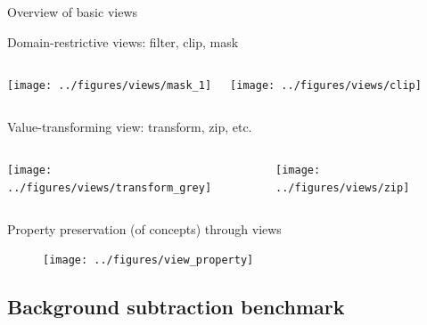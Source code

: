 \documentclass[12pt,aspectratio=169]{beamer}
\begin{document}
\begin{frame}[fragile]{Overview of basic views}
  \begin{alertblock}{Domain-restrictive views: filter, clip, mask}
    \begin{columns}[T,onlytextwidth]
      \vspace{0.5cm}
      \texttt{[image: ../figures/views/mask\_1]}

      \vspace{0.5cm}
      \texttt{[image: ../figures/views/clip]}
    \end{columns}
  \end{alertblock}

  \begin{alertblock}{Value-transforming view: transform, zip, etc.}
    \begin{columns}[T,onlytextwidth]
      \vspace{0.5cm}
      \texttt{[image: ../figures/views/transform\_grey]}

      \vspace{0.5cm}
      \texttt{[image: ../figures/views/zip]}
    \end{columns}
  \end{alertblock}
\end{frame}

\begin{frame}[fragile]{Property preservation (of concepts) through views}
  \centering
  \begin{figure}
    \texttt{[image: ../figures/view\_property]}
  \end{figure}
\end{frame}

\subsection{Background subtraction benchmark}
\end{document}
